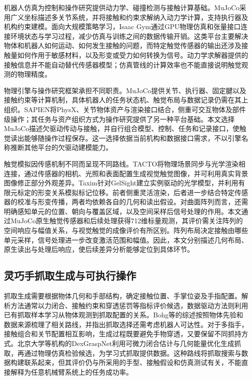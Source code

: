 机器人仿真为控制和操作研究提供动力学、碰撞检测与接触计算基础。MuJoCo采用广义坐标描述多关节系统，并将接触和约束求解纳入动力学计算，支持执行器及机构约束建模\cite{todorov2012mujoco}。面向大规模策略学习，Isaac Gym通过GPU物理仿真和张量接口连接环境状态与学习过程，减少仿真与训练之间的数据传输开销\cite{makoviychuk2021isaacgym}。这类平台主要解决物体和机器人如何运动、如何发生接触的问题，而特定触觉传感器的输出还涉及接触量如何作用于敏感材料，以及形变或受力如何转换为信号。动力学求解器提供的接触信息并不能自动替代传感器模型；仿真管线的计算效率也不能直接说明触觉观测的物理精度。

物理引擎与操作研究框架承担不同职责。MuJoCo提供关节、执行器、固定腱以及接触约束等计算机制，具体机器人的任务状态机、触觉布局与数据记录仍需在其上组织。SAPIEN将PhysX、关节物体资产与渲染接口结合，侧重可交互物体及部件级操作\cite{xiang2020sapien}；其任务与资产组织方式为操作研究提供了另一种平台基础。本文选择MuJoCo描述欠驱动传动与接触，并自行组合模型、控制、任务和记录接口，使触觉读出能够随操作过程保存。这一选择依据当前机构和数据接口需求，不以引擎名称推断其他平台的欠驱动建模能力。

触觉模拟因传感机制不同而呈现不同路线。TACTO将物理场景同步与光学渲染相连接，通过传感器的相机、光照和表面配置生成视觉触觉图像，并可利用真实背景图像修正部分外观差异\cite{wang2022tacto}。Taxim针对GelSight建立实例驱动的光学模型，并利用有限元标定的形变关系模拟标记位移\cite{si2022taxim}。前者侧重灵活渲染，后者进一步结合特定传感器的校准与形变传播，两者均依赖各自的几何和读出假设。对曲面阵列而言，还需明确感知单元的位置、朝向与覆盖区域，以及空间采样后信号处理的作用。本文通过MuJoCo原生触觉传感器和后续处理获得712维标量观测，其评价需关注阵列的空间响应与幅值关系，与视觉触觉的成像评价有所区别。阵列布局决定接触由哪些单元采样，信号处理进一步改变激活范围和幅值。因此，本文分别描述几何布局、原生读出与处理后响应，使后续差异分析能够定位到具体环节。

\subsection{灵巧手抓取生成与可执行操作}
\label{subsec:grasp_generation_execution}

抓取生成需要根据物体几何和手部结构，确定接触位置、手掌位姿及手指配置。解析方法通常以力闭合、接触约束和穿透惩罚等指标评价候选，数据驱动方法则利用已有抓取样本学习从物体观测到抓取配置的关系。Bohg等的综述按照物体先验和数据来源梳理了相关路线，并指出抓取选择还需考虑机器人可达性\cite{bohg2014grasp}。对于多指手，接触组合和关节配置相互影响，生成过程既要避免手物穿透，又要保留不同抓持方式。北京大学等机构的DexGraspNet利用可微力闭合估计与几何能量优化生成抓取，再通过物理仿真检验候选，为学习式抓取提供数据\cite{wang2023dexgraspnet}。这种路线将抓取搜索与数据构建联系起来，但其评价仍与所采用的手型、接触假设和仿真测试有关，不能直接解释为任意机械臂系统上的任务成功率。

